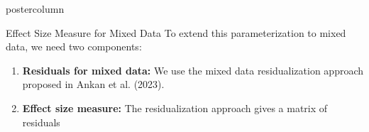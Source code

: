 \documentclass{beamer}
\newlength{\columnheight}
\begin{document}
\begin{frame}
\begin{columns}
	\begin{column}{.33\textwidth}
		\begin{beamercolorbox}[center]{postercolumn}
			\begin{minipage}{.98\textwidth} %
				\parbox[t][\columnheight]{\textwidth}{ %
	\begin{myblock}{Effect Size Measure for Mixed Data}
		To extend this parameterization to mixed data, we need two components:

		\begin{enumerate}
			\item \textbf{Residuals for mixed data:} We use the mixed data residualization approach proposed in Ankan et al. (2023).
			\item \textbf{Effect size measure:} The residualization approach gives a matrix of residuals 
		\end{enumerate}






\end{myblock}}
\end{minipage}
\end{beamercolorbox}
\end{column}
\end{columns}
\end{frame}
\end{document}
